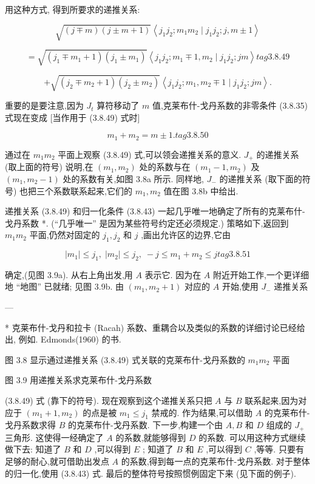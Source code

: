 用这种方式, 得到所要求的递推关系:

$$
\sqrt{\left( {j \mp m}\right) \left( {j \pm m + 1}\right) }\left\langle {{j}_{1}{j}_{2};{m}_{1}{m}_{2} \mid {j}_{1}{j}_{2};j, m \pm 1}\right\rangle
$$

$$
= \sqrt{\left( {{j}_{1} \mp {m}_{1} + 1}\right) \left( {{j}_{1} \pm {m}_{1}}\right) }\left\langle {{j}_{1}{j}_{2};{m}_{1} \mp 1,{m}_{2} \mid {j}_{1}{j}_{2};{jm}}\right\rangle tag{3.8.49}
$$

$$
+ \sqrt{\left( {{j}_{2} \mp {m}_{2} + 1}\right) \left( {{j}_{2} \pm {m}_{2}}\right) }\left\langle {{j}_{1}{j}_{2};{m}_{1},{m}_{2} \mp 1 \mid {j}_{1}{j}_{2};{jm}}\right\rangle .
$$

重要的是要注意,因为 ${J}_{t}$ 算符移动了 $m$ 值,克莱布什-戈丹系数的非零条件 (3.8.35) 式现在变成 [当作用于 (3.8.49) 式时]

$$
{m}_{1} + {m}_{2} = m \pm 1. tag{3. 8.50}
$$

通过在 ${m}_{1}{m}_{2}$ 平面上观察 (3.8.49) 式,可以领会递推关系的意义. ${J}_{ + }$ 的递推关系 (取上面的符号) 说明,在 $\left( {{m}_{1},{m}_{2}}\right)$ 处的系数与在 $\left( {{m}_{1} - 1,{m}_{2}}\right)$ 及 $\left( {{m}_{1},{m}_{2} - 1}\right)$ 处的系数有关,如图 3.8a 所示. 同样地, ${J}_{ - }$ 的递推关系 (取下面的符号) 也把三个系数联系起来,它们的 ${m}_{1},{m}_{2}$ 值在图 3.8b 中给出.

递推关系 (3.8.49) 和归一化条件 (3.8.43) 一起几乎唯一地确定了所有的克莱布什- 戈丹系数 *. (“几乎唯一” 是因为某些符号约定还必须规定.) 策略如下,返回到 ${m}_{1}{m}_{2}$ 平面,仍然对固定的 ${j}_{1},{j}_{2}$ 和 $j$ ,画出允许区的边界,它由

$$
\left| {m}_{1}\right| \leq {j}_{1},\;\left| {m}_{2}\right| \leq {j}_{2},\; - j \leq {m}_{1} + {m}_{2} \leq j tag{3.8.51}
$$

确定,(见图 3.9a). 从右上角出发,用 $A$ 表示它. 因为在 $A$ 附近开始工作,一个更详细地 “地图” 已就绪; 见图 3.9b. 由 $\left( {{m}_{1},{m}_{2} + 1}\right)$ 对应的 $A$ 开始,使用 ${J}_{ - }$ 递推关系

---

* 克莱布什-戈丹和拉卡 (Racah) 系数、重耦合以及类似的系数的详细讨论已经给出, 例如. Edmonds(1960) 的书.


图 3.8 显示通过递推关系 (3.8.49) 式关联的克莱布什-戈丹系数的 ${m}_{1}{m}_{2}$ 平面


图 3.9 用递推关系求克莱布什-戈丹系数

(3.8.49) 式 (靠下的符号). 现在观察到这个递推关系只把 $A$ 与 $B$ 联系起来,因为对应于 $\left( {{m}_{1} + 1,{m}_{2}}\right)$ 的点是被 ${m}_{1} \leq {j}_{1}$ 禁戒的. 作为结果,可以借助 $A$ 的克莱布什-戈丹系数求得 $B$ 的克莱布什-戈丹系数. 下一步,构建一个由 $A, B$ 和 $D$ 组成的 ${J}_{ + }$ 三角形. 这使得一经确定了 $A$ 的系数,就能够得到 $D$ 的系数. 可以用这种方式继续做下去: 知道了 $B$ 和 $D$ ,可以得到 $E$ ; 知道了 $B$ 和 $E$ ,可以得到 $C$ ,等等. 只要有足够的耐心,就可借助出发点 $A$ 的系数,得到每一点的克莱布什-戈丹系数. 对于整体的归一化,使用 (3.8.43) 式. 最后的整体符号按照惯例固定下来 (见下面的例子).

